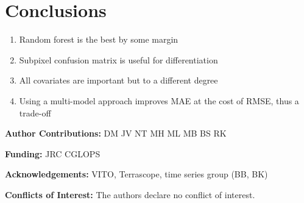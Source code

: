 \documentclass[a4paper,10pt]{article}
\newcommand{\minisection}[1]{\medskip \textbf{#1:}}
\begin{document}
\section{Conclusions}

\begin{enumerate}
 \item Random forest is the best by some margin
 \item Subpixel confusion matrix is useful for differentiation
 \item All covariates are important but to a different degree
 \item Using a multi-model approach improves MAE at the cost of RMSE, thus a trade-off
\end{enumerate}

\minisection{Author Contributions} DM JV NT MH ML MB BS RK

\minisection{Funding} JRC CGLOPS

\minisection{Acknowledgements} VITO, Terrascope, time series group (BB, BK)

\minisection{Conflicts of Interest} The authors declare no conflict of interest.


\printnoidxglossary[type=acronym]


\end{document}

